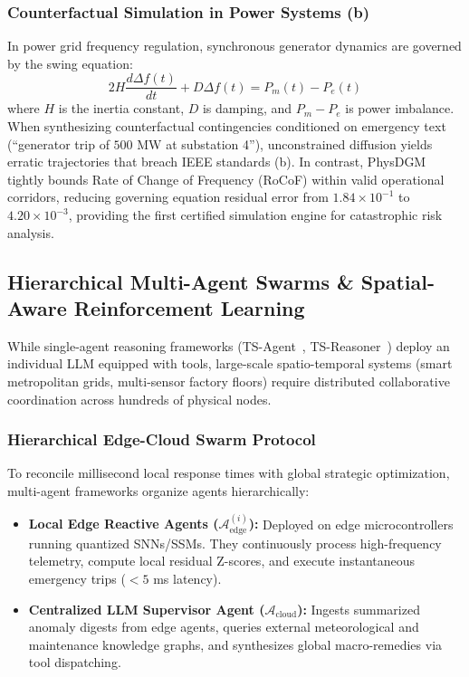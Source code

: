 \subsubsection{Counterfactual Simulation in Power Systems (b)}
In power grid frequency regulation, synchronous generator dynamics are governed by the swing equation:
\begin{equation}
    2H \frac{d\Delta f(t)}{dt} + D \Delta f(t) = P_m(t) - P_e(t)
\end{equation}
where $H$ is the inertia constant, $D$ is damping, and $P_m - P_e$ is power imbalance. When synthesizing counterfactual contingencies conditioned on emergency text (``generator trip of $500$ MW at substation 4''), unconstrained diffusion yields erratic trajectories that breach IEEE standards (b). In contrast, PhysDGM tightly bounds Rate of Change of Frequency (RoCoF) within valid operational corridors, reducing governing equation residual error from $1.84 \times 10^{-1}$ to $4.20 \times 10^{-3}$, providing the first certified simulation engine for catastrophic risk analysis.

\subsection{Hierarchical Multi-Agent Swarms \& Spatial-Aware Reinforcement Learning}
\label{sec:multiagent_swarms}
While single-agent reasoning frameworks (TS-Agent~\cite{Liu2025TSAgent}, TS-Reasoner~\cite{Ye2024TSReasoner}) deploy an individual LLM equipped with tools, large-scale spatio-temporal systems (smart metropolitan grids, multi-sensor factory floors) require distributed collaborative coordination across hundreds of physical nodes.

\subsubsection{Hierarchical Edge-Cloud Swarm Protocol}
To reconcile millisecond local response times with global strategic optimization, multi-agent frameworks organize agents hierarchically:
\begin{itemize}
    \item \textbf{Local Edge Reactive Agents ($\mathcal{A}_{\text{edge}}^{(i)}$):} Deployed on edge microcontrollers running quantized SNNs/SSMs. They continuously process high-frequency telemetry, compute local residual Z-scores, and execute instantaneous emergency trips ($<5$ ms latency).
    \item \textbf{Centralized LLM Supervisor Agent ($\mathcal{A}_{\text{cloud}}$):} Ingests summarized anomaly digests from edge agents, queries external meteorological and maintenance knowledge graphs, and synthesizes global macro-remedies via tool dispatching.
\end{itemize}

